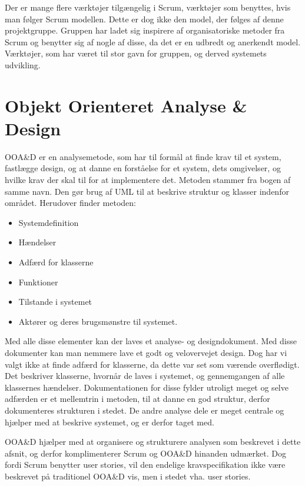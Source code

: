 Der er mange flere værktøjer tilgængelig i Scrum, værktøjer som benyttes, hvis man følger Scrum modellen.
Dette er dog ikke den model, der følges af denne projektgruppe.
Gruppen har ladet sig inspirere af organisatoriske metoder fra Scrum og benytter sig af nogle af disse, da det er en udbredt og anerkendt model.
Værktøjer, som har været til stor gavn for gruppen, og derved systemets udvikling.

\section{Objekt Orienteret Analyse \& Design}
OOA\&D er en analysemetode, som har til formål at finde krav til et system, fastlægge design, og at danne en forståelse for et system, dets omgivelser, og hvilke krav der skal til for at implementere det.
Metoden stammer fra bogen af samme navn.\citep{OOA&D2001}
Den gør brug af UML til at beskrive struktur og klasser indenfor området.
Herudover finder metoden:

\begin{itemize}
\item Systemdefinition
\item Hændelser
\item Adfærd for klasserne
\item Funktioner
\item Tilstande i systemet
\item Aktører og deres brugsmønstre til systemet.
\end{itemize}

Med alle disse elementer kan der laves et analyse- og designdokument.
Med disse dokumenter kan man nemmere lave et godt og velovervejet design.
Dog har vi valgt ikke at finde adfærd for klasserne, da dette var set som værende overflødigt.
Det beskriver klasserne, hvornår de laves i systemet, og gennemgangen af alle klassernes hændelser. 
Dokumentationen for disse fylder utroligt meget og selve adfærden er et mellemtrin i metoden, til at danne en god struktur, derfor dokumenteres strukturen i stedet.
De andre analyse dele er meget centrale og hjælper med at beskrive systemet, og er derfor taget med. 


OOA\&D hjælper med at organisere og strukturere analysen som beskrevet i dette afsnit, og derfor komplimenterer Scrum og OOA\&D hinanden udmærket.
Dog fordi Scrum benytter user stories, vil den endelige kravspecifikation ikke være beskrevet på traditionel OOA\&D vis, men i stedet vha. user stories.









